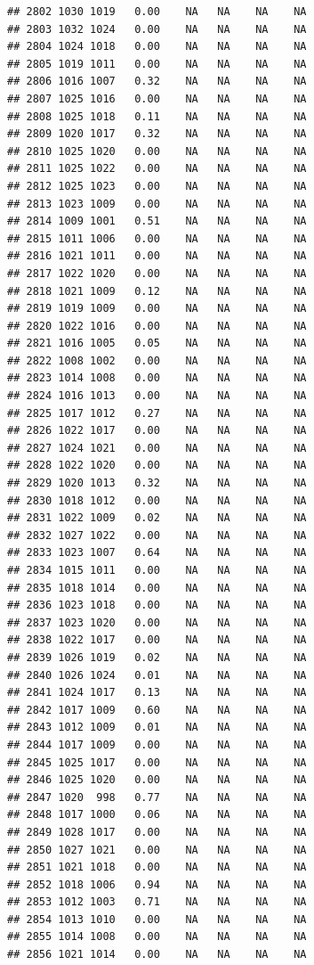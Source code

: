 \documentclass{article}\usepackage{graphicx, color}
\makeatletter
\newenvironment{kframe}{%
 \def\at@end@of@kframe{}%
 \ifinner\ifhmode%
  \def\at@end@of@kframe{\end{minipage}}%
  \begin{minipage}{\columnwidth}%
 \fi\fi%
 \def\FrameCommand##1{\hskip\@totalleftmargin \hskip-\fboxsep
 \colorbox{shadecolor}{##1}\hskip-\fboxsep
     \hskip-\linewidth \hskip-\@totalleftmargin \hskip\columnwidth}%
 \MakeFramed {\advance\hsize-\width
   \@totalleftmargin\z@ \linewidth\hsize
   \@setminipage}}%
 {\par\unskip\endMakeFramed%
 \at@end@of@kframe}
\newenvironment{knitrout}{}{} %
\makeatother
\begin{document}
\begin{knitrout}
\begin{kframe}
\begin{verbatim}
## 2802 1030 1019   0.00    NA   NA    NA    NA
## 2803 1032 1024   0.00    NA   NA    NA    NA
## 2804 1024 1018   0.00    NA   NA    NA    NA
## 2805 1019 1011   0.00    NA   NA    NA    NA
## 2806 1016 1007   0.32    NA   NA    NA    NA
## 2807 1025 1016   0.00    NA   NA    NA    NA
## 2808 1025 1018   0.11    NA   NA    NA    NA
## 2809 1020 1017   0.32    NA   NA    NA    NA
## 2810 1025 1020   0.00    NA   NA    NA    NA
## 2811 1025 1022   0.00    NA   NA    NA    NA
## 2812 1025 1023   0.00    NA   NA    NA    NA
## 2813 1023 1009   0.00    NA   NA    NA    NA
## 2814 1009 1001   0.51    NA   NA    NA    NA
## 2815 1011 1006   0.00    NA   NA    NA    NA
## 2816 1021 1011   0.00    NA   NA    NA    NA
## 2817 1022 1020   0.00    NA   NA    NA    NA
## 2818 1021 1009   0.12    NA   NA    NA    NA
## 2819 1019 1009   0.00    NA   NA    NA    NA
## 2820 1022 1016   0.00    NA   NA    NA    NA
## 2821 1016 1005   0.05    NA   NA    NA    NA
## 2822 1008 1002   0.00    NA   NA    NA    NA
## 2823 1014 1008   0.00    NA   NA    NA    NA
## 2824 1016 1013   0.00    NA   NA    NA    NA
## 2825 1017 1012   0.27    NA   NA    NA    NA
## 2826 1022 1017   0.00    NA   NA    NA    NA
## 2827 1024 1021   0.00    NA   NA    NA    NA
## 2828 1022 1020   0.00    NA   NA    NA    NA
## 2829 1020 1013   0.32    NA   NA    NA    NA
## 2830 1018 1012   0.00    NA   NA    NA    NA
## 2831 1022 1009   0.02    NA   NA    NA    NA
## 2832 1027 1022   0.00    NA   NA    NA    NA
## 2833 1023 1007   0.64    NA   NA    NA    NA
## 2834 1015 1011   0.00    NA   NA    NA    NA
## 2835 1018 1014   0.00    NA   NA    NA    NA
## 2836 1023 1018   0.00    NA   NA    NA    NA
## 2837 1023 1020   0.00    NA   NA    NA    NA
## 2838 1022 1017   0.00    NA   NA    NA    NA
## 2839 1026 1019   0.02    NA   NA    NA    NA
## 2840 1026 1024   0.01    NA   NA    NA    NA
## 2841 1024 1017   0.13    NA   NA    NA    NA
## 2842 1017 1009   0.60    NA   NA    NA    NA
## 2843 1012 1009   0.01    NA   NA    NA    NA
## 2844 1017 1009   0.00    NA   NA    NA    NA
## 2845 1025 1017   0.00    NA   NA    NA    NA
## 2846 1025 1020   0.00    NA   NA    NA    NA
## 2847 1020  998   0.77    NA   NA    NA    NA
## 2848 1017 1000   0.06    NA   NA    NA    NA
## 2849 1028 1017   0.00    NA   NA    NA    NA
## 2850 1027 1021   0.00    NA   NA    NA    NA
## 2851 1021 1018   0.00    NA   NA    NA    NA
## 2852 1018 1006   0.94    NA   NA    NA    NA
## 2853 1012 1003   0.71    NA   NA    NA    NA
## 2854 1013 1010   0.00    NA   NA    NA    NA
## 2855 1014 1008   0.00    NA   NA    NA    NA
## 2856 1021 1014   0.00    NA   NA    NA    NA

\end{verbatim}
\end{kframe}
\end{knitrout}
\end{document}
